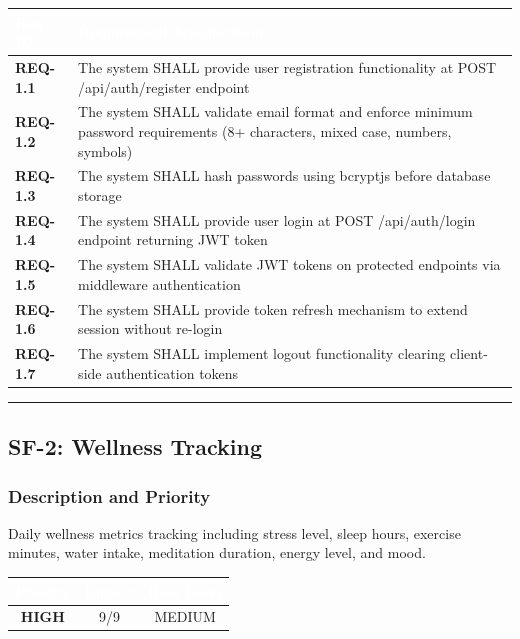 \documentclass[12pt,a4paper]{article}
\begin{document}
\vspace{0.3em}
\begin{center}
\begin{tabular}{|l|p{11cm}|}
\hline
\rowcolor{deepblue}
\textcolor{white}{\textbf{Req ID}} & \textcolor{white}{\textbf{Requirement Specification}} \\
\hline
\rowcolor{lightgray}
\textbf{REQ-1.1} & The system SHALL provide user registration functionality at POST /api/auth/register endpoint \\
\hline
\textbf{REQ-1.2} & The system SHALL validate email format and enforce minimum password requirements (8+ characters, mixed case, numbers, symbols) \\
\hline
\rowcolor{lightgray}
\textbf{REQ-1.3} & The system SHALL hash passwords using bcryptjs before database storage \\
\hline
\textbf{REQ-1.4} & The system SHALL provide user login at POST /api/auth/login endpoint returning JWT token \\
\hline
\rowcolor{lightgray}
\textbf{REQ-1.5} & The system SHALL validate JWT tokens on protected endpoints via middleware authentication \\
\hline
\textbf{REQ-1.6} & The system SHALL provide token refresh mechanism to extend session without re-login \\
\hline
\rowcolor{lightgray}
\textbf{REQ-1.7} & The system SHALL implement logout functionality clearing client-side authentication tokens \\
\hline
\end{tabular}
\end{center}

\vspace{1em}
\hrule

\subsection{SF-2: Wellness Tracking}

\subsubsection{Description and Priority}
Daily wellness metrics tracking including stress level, sleep hours, exercise minutes, water intake, meditation duration, energy level, and mood.

\vspace{0.3em}
\begin{center}
\begin{tabular}{|c|c|c|}
\hline
\rowcolor{accentblue}
\textcolor{white}{\textbf{Priority}} & \textcolor{white}{\textbf{Impact}} & \textcolor{white}{\textbf{Risk Level}} \\
\hline
\rowcolor{lightgray}
\textbf{\textcolor{deepblue}{HIGH}} & 9/9 & MEDIUM \\
\hline
\end{tabular}
\end{center}
\end{document}
